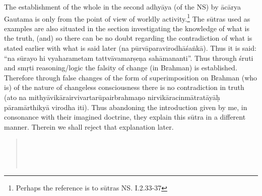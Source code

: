 The establishment of the whole in the second adhyāya (of the NS) by ācārya Gautama is only from the point of view of worldly activity.\footnote{Perhaps the reference is to sūtras NS. I.2.33-37} The sūtras used as examples are also situated in the section investigating the knowledge of what is the truth, (and) so there can be no doubt regarding the contradiction of what is stated earlier with what is said later (na pūrvāparavirodhāśaṅkā). Thus it is said: “na sūrayo hi vyaharametam tattvāvamarṣeṇa sahāmananti”. Thus through śruti and smṛti reasoning/logic the falsity of change (in Brahman) is established. Therefore through false changes of the form of superimposition on Brahman (who is) of the nature of changeless consciousness there is no contradiction in truth (ato na mithyāvikārairvivartarūpairbrahmaṇo nirvikāracinmātratāyāḥ pāramārthikyā virodha iti). Thus abandoning the introduction given by me, in consonance with their imagined doctrine, they explain this sūtra in a different manner. Therein we shall reject that explanation later.

\vskip -2pt

\begin{verse}
\\
\\
\\
\end{verse}

\vskip -1pt


\vskip -1pt

